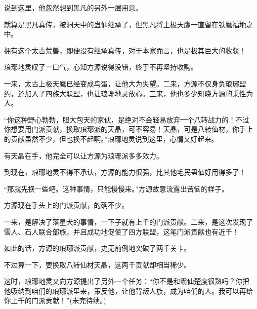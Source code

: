 \begin{this_body}
说到这里，他忽然想到黑凡的另外一层用意。

就算是黑凡真传，被洞天中的蛊仙继承了，但黑凡将上极天鹰一直留在铁鹰福地之中。

拥有这个太古荒兽，即便没有继承真传，对于本家而言，也是极其巨大的收获！

琅琊地灵叹了一口气，心知方源说得没错，终于不再坚持收购。

一来，太古上极天鹰已经变成鸟蛋，让他大为失望。二来，方源不仅身负琅琊盟约，还加入了四族大联盟，也让琅琊地灵放心。三来，他也多少知晓方源的秉性为人。

“你这种野心勃勃，胆大包天的家伙，是绝对不会轻易放弃一个八转战力的！不过你想要用门派贡献，换取琅琊派的天晶，可不容易！天晶，可是八转仙材，你手上的贡献虽然不少，但也换不起啊。”琅琊地灵说到这里，心情又好起来。

有天晶在手，他完全可以让方源为琅琊派多多效力。

到现在，琅琊地灵不得不承认，方源的能力很强，比其他毛民蛊仙好用得多了！

“那就先换一些吧。这种事情，只能慢慢来。”方源故意流露出苦恼的样子。

方源现在手头上的门派贡献，的确不少。

一来，是解决了落星犬的事情，一下子就有上千的门派贡献。二来，是这次发现了雪人、石人联合部族，并且成功地促使了四方联盟，这笔门派贡献也有近千！

如此的话，方源的琅琊派贡献，史无前例地突破了两千关卡。

不过算一下，要换取八转仙材天晶，这两千贡献却相当稀少。

这时，琅琊地灵又向方源提出了另外一个任务：“你不是和霸仙楚度很熟吗？你把他吸纳到咱们的琅琊派里来，策反他，让他背叛人族，成为咱们的人。我可以再给你上千的门派贡献！”(未完待续。)

\end{this_body}

